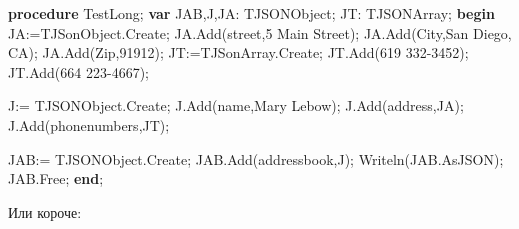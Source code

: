 \documentclass[
]{article}
\newenvironment{Shaded}{}{}
\newcommand{\DecValTok}[1]{\textcolor[rgb]{0.25,0.63,0.44}{#1}}
\newcommand{\KeywordTok}[1]{\textcolor[rgb]{0.00,0.44,0.13}{\textbf{#1}}}
\newcommand{\NormalTok}[1]{#1}
\newcommand{\StringTok}[1]{\textcolor[rgb]{0.25,0.44,0.63}{#1}}
\begin{document}
\begin{Shaded}
\begin{Highlighting}[]
\KeywordTok{procedure}\NormalTok{ TestLong;}
\KeywordTok{var}
\NormalTok{  JAB,J,JA: TJSONObject;}
\NormalTok{  JT: TJSONArray;}
\KeywordTok{begin}
\NormalTok{  JA:=TJSonObject.Create;}
\NormalTok{  JA.Add(}\StringTok{\textquotesingle{}street\textquotesingle{}}\NormalTok{,}\StringTok{\textquotesingle{}5 Main Street\textquotesingle{}}\NormalTok{);}
\NormalTok{  JA.Add(}\StringTok{\textquotesingle{}City\textquotesingle{}}\NormalTok{,}\StringTok{\textquotesingle{}San Diego, CA\textquotesingle{}}\NormalTok{);}
\NormalTok{  JA.Add(}\StringTok{\textquotesingle{}Zip\textquotesingle{}}\NormalTok{,}\DecValTok{91912}\NormalTok{);}
\NormalTok{  JT:=TJSonArray.Create;}
\NormalTok{  JT.Add(}\StringTok{\textquotesingle{}619 332{-}3452\textquotesingle{}}\NormalTok{);}
\NormalTok{  JT.Add(}\StringTok{\textquotesingle{}664 223{-}4667\textquotesingle{}}\NormalTok{);}

\NormalTok{  J:= TJSONObject.Create;}
\NormalTok{  J.Add(}\StringTok{\textquotesingle{}name\textquotesingle{}}\NormalTok{,}\StringTok{\textquotesingle{}Mary Lebow\textquotesingle{}}\NormalTok{);}
\NormalTok{  J.Add(}\StringTok{\textquotesingle{}address\textquotesingle{}}\NormalTok{,JA);}
\NormalTok{  J.Add(}\StringTok{\textquotesingle{}phonenumbers\textquotesingle{}}\NormalTok{,JT);}

\NormalTok{  JAB:= TJSONObject.Create;}
\NormalTok{  JAB.Add(}\StringTok{\textquotesingle{}addressbook\textquotesingle{}}\NormalTok{,J);}
\NormalTok{  Writeln(JAB.AsJSON);}
\NormalTok{  JAB.Free;}
\KeywordTok{end}\NormalTok{;}
\end{Highlighting}
\end{Shaded}

Или короче:
\end{document}
